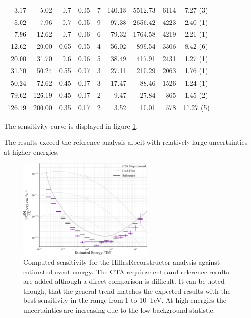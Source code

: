 \begin{tabular}{r r r r r r r r c }
        \num{3.17} & \num{5.02} & 0.7 & 0.05 & 7 & \num{140.18} & \num{5512.73} & \num{6114} & \num{7.27} (\num{3}) \\
        \num{5.02} & \num{7.96} & 0.7 & 0.05 & 9 & \num{97.38} & \num{2656.42} & \num{4223} & \num{2.40} (\num{1}) \\
        \num{7.96} & \num{12.62} & 0.7 & 0.06 & 6 & \num{79.32} & \num{1764.58} & \num{4219} & \num{2.21} (\num{1}) \\
        \num{12.62} & \num{20.00} & 0.65 & 0.05 & 4 & \num{56.02} & \num{899.54} & \num{3306} & \num{8.42} (\num{6}) \\
        \num{20.00} & \num{31.70} & 0.6 & 0.06 & 5 & \num{38.49} & \num{417.91} & \num{2431} & \num{1.27} (\num{1}) \\
        \num{31.70} & \num{50.24} & 0.55 & 0.07 & 3 & \num{27.11} & \num{210.29} & \num{2063} & \num{1.76} (\num{1}) \\
        \num{50.24} & \num{72.62} & 0.45 & 0.07 & 3 & \num{17.47} & \num{88.46} & \num{1526} & \num{1.24} (\num{1}) \\
        \num{79.62} & \num{126.19} & 0.45 & 0.07 & 2 & \num{9.47} & \num{27.84} & \num{865} & \num{1.45} (\num{2}) \\
        \num{126.19} & \num{200.00} & 0.35 & 0.17 & 2 & \num{3.52} & \num{10.01} & \num{578} & \num{17.27} (\num{5}) \\
    \end{tabular}
    \label{tab:test}
\clearpage
\newpage
\normalsetting



The sensitivity curve is displayed in figure \ref{fig:hillas_sens}.

The results exceed the reference analysis albeit with relatively large uncertainties
at higher energies.

\begin{figure}
    \centering
    \captionsetup{width=0.9\linewidth}
    \includegraphics[width=0.6\textwidth]{../analysis/plots/sensitivity/hillas_sensitivity.pdf} 
    \caption{Computed sensitivity for the HillasReconstructor analysis against estimated event energy.
    The CTA requirements and
    reference results are added although a direct comparison is difficult. It can be noted though, that
    the general trend matches the expected results with the best sensitivity in the range from
    \num{1} to \SI{10}{\tera\electronvolt}. At high energies the uncertainties are increasing due to the low
    background statistic.}
    \label{fig:hillas_sens}
\end{figure}

